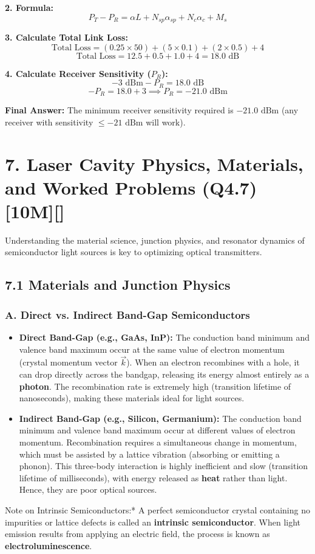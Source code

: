 \textbf{2. Formula:}
\[ P_T - P_R = \alpha L + N_{sp}\alpha_{sp} + N_c\alpha_c + M_s \]

\textbf{3. Calculate Total Link Loss:}
\[ \text{Total Loss} = (0.25 \times 50) + (5 \times 0.1) + (2 \times 0.5) + 4 \]
\[ \text{Total Loss} = 12.5 + 0.5 + 1.0 + 4 = 18.0\text{ dB} \]

\textbf{4. Calculate Receiver Sensitivity ($P_R$):}
\[ -3\text{ dBm} - P_R = 18.0\text{ dB} \]
\[ -P_R = 18.0 + 3 \implies P_R = -21.0\text{ dBm} \]

\textbf{Final Answer:}
The minimum receiver sensitivity required is \textbf{$-21.0\text{ dBm}$} (any receiver with sensitivity $\le -21\text{ dBm}$ will work).


\section{7. Laser Cavity Physics, Materials, and Worked Problems (Q4.7) [10M][]}

Understanding the material science, junction physics, and resonator dynamics of semiconductor light sources is key to optimizing optical transmitters.

\subsection{7.1 Materials and Junction Physics}

\subsubsection{A. Direct vs. Indirect Band-Gap Semiconductors}
\begin{itemize}
  \item   \textbf{Direct Band-Gap (e.g., GaAs, InP):} The conduction band minimum and valence band maximum occur at the same value of electron momentum (crystal momentum vector $\vec{k}$). When an electron recombines with a hole, it can drop directly across the bandgap, releasing its energy almost entirely as a \textbf{photon}. The recombination rate is extremely high (transition lifetime of nanoseconds), making these materials ideal for light sources.
  \item   \textbf{Indirect Band-Gap (e.g., Silicon, Germanium):} The conduction band minimum and valence band maximum occur at different values of electron momentum. Recombination requires a simultaneous change in momentum, which must be assisted by a lattice vibration (absorbing or emitting a phonon). This three-body interaction is highly inefficient and slow (transition lifetime of milliseconds), with energy released as \textbf{heat} rather than light. Hence, they are poor optical sources.
\end{itemize}
\textit{   }Note on Intrinsic Semiconductors:* A perfect semiconductor crystal containing no impurities or lattice defects is called an \textbf{intrinsic semiconductor}. When light emission results from applying an electric field, the process is known as \textbf{electroluminescence}.

